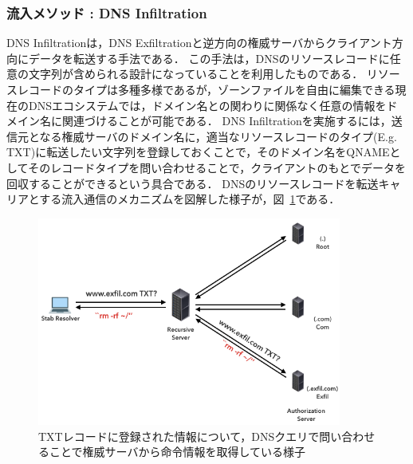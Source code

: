 
\subsubsection{流入メソッド : DNS Infiltration}
\label{sec:dns-infiltration}
DNS Infiltrationは，DNS Exfiltrationと逆方向の権威サーバからクライアント方向にデータを転送する手法である．
この手法は，DNSのリソースレコードに任意の文字列が含められる設計になっていることを利用したものである．
リソースレコードのタイプは多種多様であるが，ゾーンファイルを自由に編集できる現在のDNSエコシステムでは，ドメイン名との関わりに関係なく任意の情報をドメイン名に関連づけることが可能である．
DNS Infiltrationを実施するには，送信元となる権威サーバのドメイン名に，適当なリソースレコードのタイプ(E.g. TXT)に転送したい文字列を登録しておくことで，そのドメイン名をQNAMEとしてそのレコードタイプを問い合わせることで，クライアントのもとでデータを回収することができるという具合である．
DNSのリソースレコードを転送キャリアとする流入通信のメカニズムを図解した様子が，図~\ref{fig:dns-infiltration}である．

\begin{figure}[h]
 \centering
 \includegraphics[width=10.0cm]{figure/dns-infiltration.png}
 \caption{TXTレコードに登録された情報について，DNSクエリで問い合わせることで権威サーバから命令情報を取得している様子}
 \label{fig:dns-infiltration}
\end{figure}


